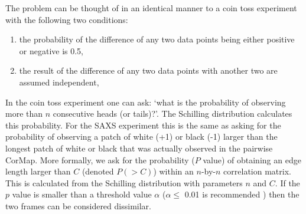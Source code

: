 The problem can be thought of in an identical manner to a coin toss experiment with the following two conditions:
\begin{enumerate}
    \item the probability of the difference of any two data points being either positive or negative is 0.5,
    \item the result of the difference of any two data points with another two are assumed independent,
\end{enumerate}
In the coin toss experiment one can ask: `what is the probability of observing more than $n$ consecutive heads (or tails)?'.
The Schilling distribution \cite{schilling1990longest} calculates this probability.
For the SAXS experiment this is the same as asking for the probability of observing a patch of white (+1) or black (-1) larger than the longest patch of white or black that was actually observed in the pairwise CorMap.
More formally, we ask for the probability ($P$ value) of obtaining an edge length larger than $C$ (denoted $P(>C)$) within an $n$-by-$n$ correlation matrix.
This is calculated from the Schilling distribution with parameters $n$ and $C$.
If the $p$ value is smaller than a threshold value $\alpha$ ($\alpha \le$ 0.01 is recommended \cite{franke2015correlation}) then the two frames can be considered dissimilar.

